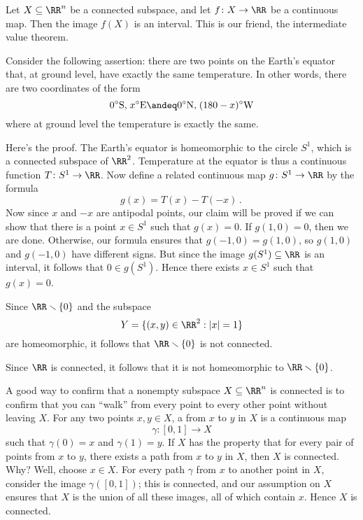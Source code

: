 \begin{exm}
	Let $X \subseteq \RR^n$ be a connected subspace, and let $f \colon X \to \RR$ be a continuous map.
	Then the image $f(X)$ is an interval.
	This is our friend, the intermediate value theorem.

	Consider the following assertion: there are two %
	points on the Earth's equator that, at ground level, have exactly the same temperature.%
	In other words, there are two coordinates of the form
	\[
		0^{\circ}\text{S,} \; x^{\circ}\text{E} \andeq 0^{\circ}\text{N,} \; (180-x)^{\circ}\text{W}
	\]
	where at ground level the temperature is exactly the same.
	
	Here's the proof.
	The Earth's equator is homeomorphic to the circle $S^1$, which is a connected subspace of $\RR^2$.
	Temperature at the equator is thus a continuous function $T \colon S^1 \to \RR$.
	Now define a related continuous map $ g \colon S^1 \to \RR$ by the formula
	\[
		g(x) = T(x)-T(-x) \period
	\]
	Now since $x$ and $-x$ are antipodal points, our claim will be proved if we can show that there is a point $x\in S^1 $ such that $g(x)=0$.
	If $g(1,0)=0$, then we are done.
	Otherwise, our formula ensures that $g(-1,0)=g(1,0)$, so $g(1,0)$ and $g(-1,0)$ have different signs.%
	But since the image $g(S^1) \subseteq\RR$ is an interval, it follows that $ 0 \in g(S^1)$.
	Hence there exists $ x \in S^1$ such that $g(x)=0$.
\end{exm}

\begin{exm}
	Since $\RR \smallsetminus\{0\} $ and the subspace
	\[
		Y = \{(x,y) \in \RR^2 : |x|=1\}
	\]
	are homeomorphic, it follows that $\RR\smallsetminus \{0\}$ is not connected.

	Since $\RR$ is connected, it follows that it is not homeomorphic to $\RR \smallsetminus \{0\}$.
\end{exm}

\begin{exm}
	A good way to confirm that a nonempty subspace $X \subseteq \RR^n$ is connected is to confirm that you can \enquote{walk} from every point to every other point without leaving $X$.
	For any two points $x,y \in X$, a  from $x$ to $y$ in $X$ is a continuous map
	\[
		\gamma \colon [0,1] \to X
	\]
	such that $\gamma(0)=x$ and $\gamma(1) = y $.
	If $X$ has the property that for every pair of points from $x$ to $y$, there exists a path from $x$ to $y$ in $X$, then $X$ is connected.%
	Why? Well, choose $x\in X$.
	For every path $\gamma$ from $x$ to another point in $X$, consider the image $\gamma([0,1])$;
	this is connected, and our assumption on $X$ ensures that $X$ is the union of all these images, all of which contain $x$.
	Hence $X$ is connected.
\end{exm}


